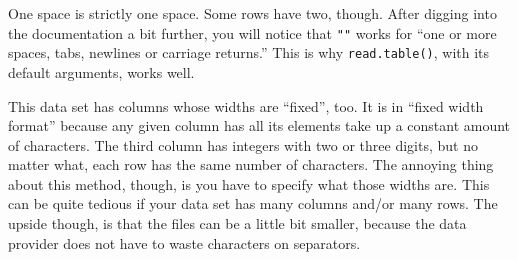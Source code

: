 \documentclass[
  12pt,
]{krantz}
\makeatletter
\newenvironment{Shaded}{\begin{snugshade}}{\end{snugshade}}
\newcommand{\AttributeTok}[1]{\textcolor[rgb]{0.61,0.61,0.61}{#1}}
\newcommand{\DecValTok}[1]{\textcolor[rgb]{0.06,0.06,0.06}{#1}}
\newcommand{\DocumentationTok}[1]{\textcolor[rgb]{0.37,0.37,0.37}{\textbf{\textit{#1}}}}
\newcommand{\FunctionTok}[1]{\textcolor[rgb]{0,0,0}{#1}}
\newcommand{\NormalTok}[1]{#1}
\newcommand{\OtherTok}[1]{\textcolor[rgb]{0.37,0.37,0.37}{#1}}
\newcommand{\StringTok}[1]{\textcolor[rgb]{0.5,0.5,0.5}{#1}}
\newenvironment{kframe}{%
\medskip{}
\setlength{\fboxsep}{.8em}
 \def\at@end@of@kframe{}%
 \ifinner\ifhmode%
  \def\at@end@of@kframe{\end{minipage}}%
  \begin{minipage}{\columnwidth}%
 \fi\fi%
 \def\FrameCommand##1{\hskip\@totalleftmargin \hskip-\fboxsep
 \colorbox{shadecolor}{##1}\hskip-\fboxsep
     \hskip-\linewidth \hskip-\@totalleftmargin \hskip\columnwidth}%
 \MakeFramed {\advance\hsize-\width
   \@totalleftmargin\z@ \linewidth\hsize
   \@setminipage}}%
 {\par\unskip\endMakeFramed%
 \at@end@of@kframe}
\renewenvironment{Shaded}{\begin{kframe}}{\end{kframe}}
\makeatother
\begin{document}
One space is strictly one space. Some rows have two, though. After digging into the documentation a bit further, you will notice that \texttt{""} works for ``one or more spaces, tabs, newlines or carriage returns.'' This is why \texttt{read.table()}, with its default arguments, works well.

\begin{Shaded}
\end{Shaded}

This data set has columns whose widths are ``fixed'', too. It is in ``fixed width format'' because any given column has all its elements take up a constant amount of characters. The third column has integers with two or three digits, but no matter what, each row has the same number of characters. The annoying thing about this method, though, is you have to specify what those widths are. This can be quite tedious if your data set has many columns and/or many rows. The upside though, is that the files can be a little bit smaller, because the data provider does not have to waste characters on separators.

\begin{Shaded}
\end{Shaded}
\end{document}
